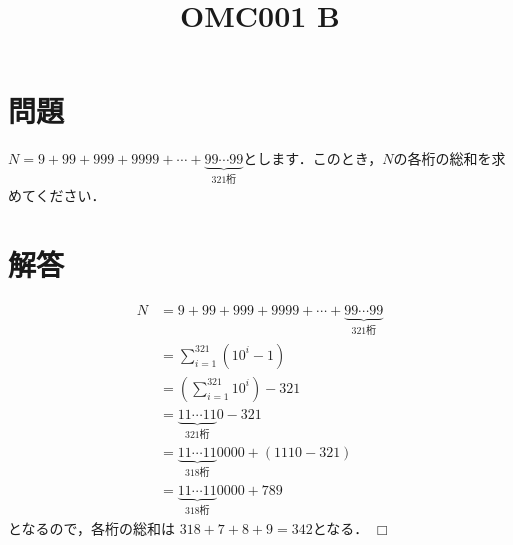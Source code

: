 \documentclass[uplatex,dvipdfmx,a4paper]{jsarticle}
\title{OMC001 B}
\date{}
\author{}
\def\qed{\hfill $\Box$}
\newenvironment{question}{\section*{問題}}{}
\newenvironment{solution}{\section*{解答}}{\qed}
\begin{document}
\maketitle
\begin{question}
    $N=9+99+999+9999+\cdots+\underbrace{99 \cdots 99}_{321 \text{桁}}$とします．このとき，$N$の各桁の総和を求めてください．
\end{question}

\begin{solution}
    \begin{align*}
        N &= 9+99+999+9999+\cdots+\underbrace{99 \cdots 99}_{321 \text{桁}} \\
        &= \sum_{i=1}^{321}\left(10^i-1\right) \\
        &= \left(\sum_{i=1}^{321}10^i\right) -321 \\
        &= \underbrace{11 \cdots 11}_{321桁}0-321 \\
        &= \underbrace{11 \cdots 11}_{318桁}0000+(1110-321) \\
        &= \underbrace{11 \cdots 11}_{318桁}0000+789
    \end{align*}
    となるので，各桁の総和は $318+7+8+9=342$となる．
\end{solution}
\end{document}
